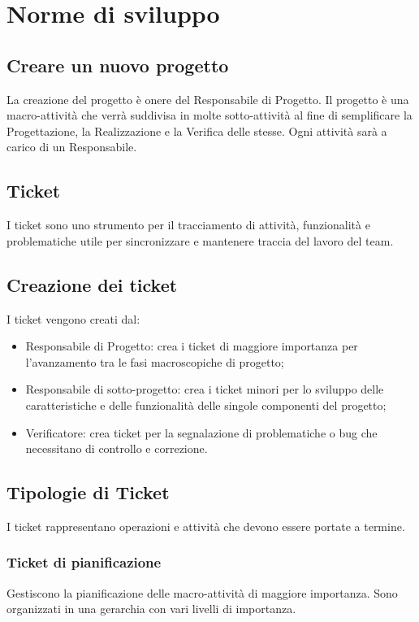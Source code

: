 \newpage
\section{Norme di sviluppo}
\label{8.0}

\subsection{Creare un nuovo progetto}
\label{8.1}
La creazione del progetto è onere del Responsabile di Progetto.
Il progetto è una macro-attività che verrà suddivisa in molte sotto-attività al fine di semplificare la Progettazione, la Realizzazione e la Verifica delle stesse. Ogni attività sarà a carico di un Responsabile.

\subsection{Ticket}
\label{8.2}
I ticket sono uno strumento per il tracciamento di attività, funzionalità e problematiche utile per sincronizzare e mantenere traccia del lavoro del team.

\subsection{Creazione dei ticket}
\label{8.3}
I ticket vengono creati dal:
\begin{itemize}
\item Responsabile di Progetto: crea i ticket di maggiore importanza per l'avanzamento tra le fasi macroscopiche di progetto;
\item Responsabile di sotto-progetto: crea i ticket minori per lo sviluppo delle caratteristiche e delle funzionalità delle singole componenti del progetto;
\item Verificatore: crea ticket per la segnalazione di problematiche o bug che necessitano di controllo e correzione.
\end{itemize}

\subsection{Tipologie di Ticket}
\label{8.4}
I ticket rappresentano operazioni e attività che devono essere portate a termine.

\subsubsection{Ticket di pianificazione}
\label{8.4.1}
Gestiscono la pianificazione delle macro-attività di maggiore importanza. Sono organizzati in una gerarchia con vari livelli di importanza.

